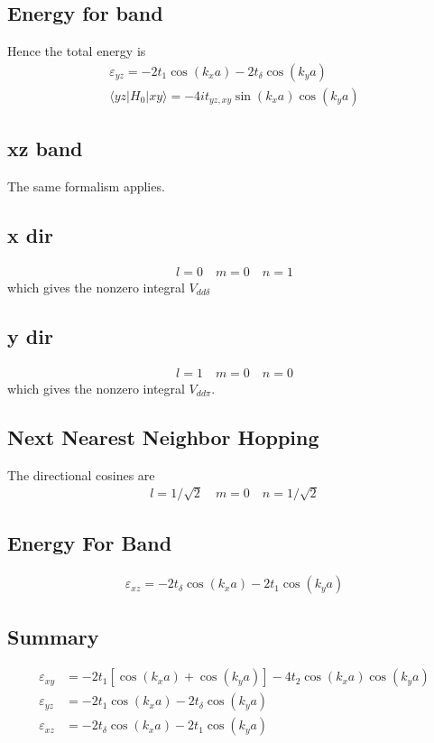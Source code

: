 \documentclass[11pt]{article}
\begin{document}
\subsection{Energy for band}
Hence the total energy is
\begin{gather}
    \varepsilon_{yz} = -2t_1 \cos(k_x a) - 2 t_\delta \cos(k_y a) \\
    \langle yz| H_0 | xy \rangle = -4i t_{yz,xy} \sin(k_x a) \cos(k_y a)
\end{gather}
\subsection{xz band}
The same formalism applies.
\subsection{x dir}
\begin{gather}
    l = 0 \quad m = 0 \quad n = 1
\end{gather}
which gives the nonzero integral $V_{dd\delta}$
\subsection{y dir}
\begin{gather}
    l= 1 \quad m= 0 \quad n=0
\end{gather}
which gives the nonzero integral $V_{dd\pi}$.
\subsection{Next Nearest Neighbor Hopping}
The directional cosines are
\begin{gather}
    l= 1/\sqrt{2} \quad m = 0 \quad n = 1/\sqrt{2}
\end{gather}
\subsection{Energy For Band}
\begin{gather}
    \varepsilon_{xz} = -2t_\delta \cos(k_x a) - 2 t_1 \cos(k_y a)
\end{gather}
\subsection{Summary}
\begin{align*}
    \varepsilon_{xy} &= -2t_1 \left[\cos(k_x a) + \cos(k_y a)\right] - 4 t_2 \cos(k_x a)\cos(k_y a) \\
    \varepsilon_{yz} &= -2t_1 \cos(k_x a) - 2 t_\delta \cos(k_y a) \\
    \varepsilon_{xz} &= -2t_\delta \cos(k_x a) - 2 t_1 \cos(k_y a)
\end{align*}    
\end{document}
